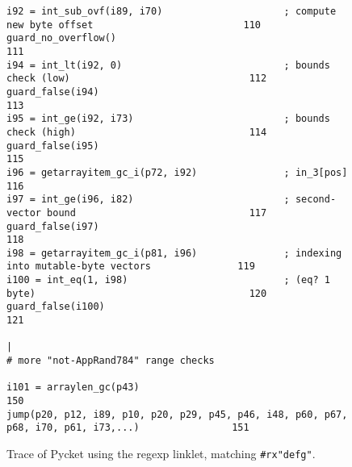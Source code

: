 \begin{figure}[!htbp]
\begin{minipage}{0.92\textwidth}
\begin{lstlisting}[style=rptrace-style]
i92 = int_sub_ovf(i89, i70)                     ; compute new byte offset                          110
guard_no_overflow()                                                                                111
i94 = int_lt(i92, 0)                            ; bounds check (low)                               112
guard_false(i94)                                                                                   113
i95 = int_ge(i92, i73)                          ; bounds check (high)                              114
guard_false(i95)                                                                                   115
i96 = getarrayitem_gc_i(p72, i92)               ; in_3[pos]                                        116
i97 = int_ge(i96, i82)                          ; second-vector bound                              117
guard_false(i97)                                                                                   118
i98 = getarrayitem_gc_i(p81, i96)               ; indexing into mutable-byte vectors               119
i100 = int_eq(1, i98)                           ; (eq? 1 byte)                                     120
guard_false(i100)                                                                                  121
                                                                                                   |
# more "not-AppRand784" range checks

i101 = arraylen_gc(p43)                                                                            150
jump(p20, p12, i89, p10, p20, p29, p45, p46, i48, p60, p67, p68, i70, p61, i73,...)                151
\end{lstlisting}

	\end{minipage}
\caption{\small Trace of Pycket using the regexp linklet, matching
		{\tt\#rx"defg"}.}
\label{fig:regexp-linklet-big-trace}
\end{figure}